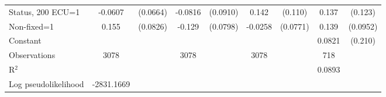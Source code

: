 \begin{tabular}{l|cccccc|cc}
Status, 200 ECU=1&  -0.0607         & (0.0664)&  -0.0816         & (0.0910)&    0.142         &  (0.110)&    0.137         &  (0.123)\\
Non-fixed=1     &    0.155\sym{*}  & (0.0826)&   -0.129         & (0.0798)&  -0.0258         & (0.0771)&    0.139         & (0.0952)\\
Constant        &                  &         &                  &         &                  &         &   0.0821         &  (0.210)\\
\hline
Observations    &     3078         &         &     3078         &         &     3078         &         &      718         &         \\
R$^2$      &                  &         &                  &         &                  &         &       0.0893           &   \\ 
Log pseudolikelihood  & -2831.1669   &         &                  &         &                  &         &           &   \\ 


\end{tabular}
